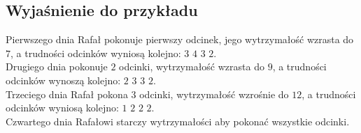 \documentclass[zad,zawodnik,utf8]{sinol}
\begin{document}
\begin{tasktext}
   \makecompactexample

  \section{Wyjaśnienie do przykładu}
Pierwszego dnia Rafał pokonuje pierwszy odcinek, jego wytrzymałość wzrasta do $7$, a trudności odcinków wyniosą kolejno: $3$ $4$ $3$ $2$.
\\Drugiego dnia pokonuje $2$ odcinki, wytrzymałość wzrasta do $9$, a trudności odcinków wynoszą kolejno: $2$ $3$ $3$ $2$.
\\Trzeciego dnia Rafał pokona $3$ odcinki, wytrzymałość wzrośnie do $12$, a trudności odcinków wyniosą kolejno: $1$ $2$ $2$ $2$.
\\Czwartego dnia Rafałowi starczy wytrzymałości aby pokonać wszystkie odcinki.

  \end{tasktext}
\end{document}
